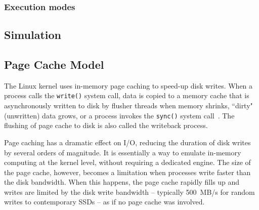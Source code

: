 \documentclass{IEEEtran}
\begin{document}
\subsubsection{Execution modes} %






\subsection{Simulation} %

\subsection{Page Cache Model} %




The Linux kernel uses in-memory page caching to speed-up disk writes. 
When a process calls the \texttt{write()} system call, data is copied 
to a memory cache that is asynchronously written to disk by flusher 
threads when memory shrinks, ``dirty" (unwritten) data grows, or a 
process invokes the \texttt{sync()} system call~\cite{love2010linux}. 
The flushing of page cache to disk is also called the writeback 
process.

Page caching has a dramatic effect on I/O, reducing the duration of 
disk writes by several orders of magnitude. It is essentially a way to 
emulate in-memory computing at the kernel level, without requiring a 
dedicated engine. The size of the page cache, however, becomes a 
limitation when processes write faster than the disk bandwidth. When 
this happens, the page cache rapidly fills up and writes are limited by 
the disk write bandwidth -- typically 500~MB/s for random writes to 
contemporary SSDs  -- as if no page cache was involved.
\end{document}
